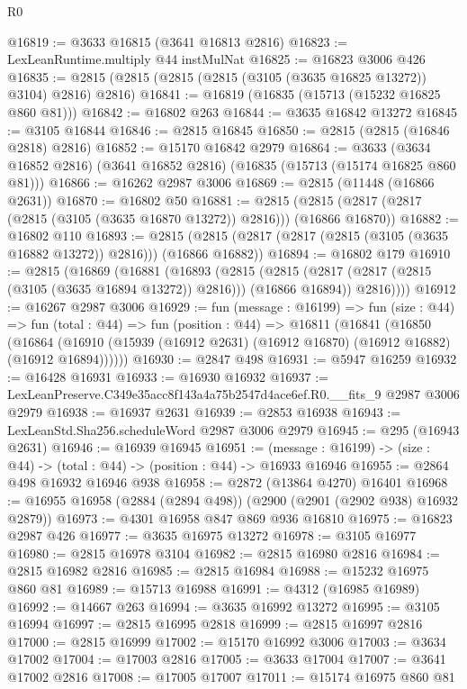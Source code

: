 \begin{lexlean}{R0}
\begin{coremodule}
@16819 := @3633 @16815 (@3641 @16813 @2816)
@16823 := LexLeanRuntime.multiply @44 instMulNat
@16825 := @16823 @3006 @426
@16835 := @2815 (@2815 (@2815 (@2815 (@3105 (@3635 @16825 @13272)) @3104) @2816) @2816)
@16841 := @16819 (@16835 (@15713 (@15232 @16825 @860 @81)))
@16842 := @16802 @263
@16844 := @3635 @16842 @13272
@16845 := @3105 @16844
@16846 := @2815 @16845
@16850 := @2815 (@2815 (@16846 @2818) @2816)
@16852 := @15170 @16842 @2979
@16864 := @3633 (@3634 @16852 @2816) (@3641 @16852 @2816) (@16835 (@15713 (@15174 @16825 @860 @81)))
@16866 := @16262 @2987 @3006
@16869 := @2815 (@11448 (@16866 @2631))
@16870 := @16802 @50
@16881 := @2815 (@2815 (@2817 (@2817 (@2815 (@3105 (@3635 @16870 @13272)) @2816))) (@16866 @16870))
@16882 := @16802 @110
@16893 := @2815 (@2815 (@2817 (@2817 (@2815 (@3105 (@3635 @16882 @13272)) @2816))) (@16866 @16882))
@16894 := @16802 @179
@16910 := @2815
    (@16869
      (@16881
        (@16893
          (@2815
            (@2815 (@2817 (@2817 (@2815 (@3105 (@3635 @16894 @13272)) @2816))) (@16866 @16894))
            @2816))))
@16912 := @16267 @2987 @3006
@16929 := fun (message : @16199) =>
  fun (size : @44) =>
  fun (total : @44) =>
  fun (position : @44) =>
  @16811
    (@16841
      (@16850
        (@16864 (@16910 (@15939 (@16912 @2631) (@16912 @16870) (@16912 @16882) (@16912 @16894))))))
@16930 := @2847 @498
@16931 := @5947 @16259
@16932 := @16428 @16931
@16933 := @16930 @16932
@16937 := LexLeanPreserve.C349e35acc8f143a4a75b2547d4ace6ef.R0.__fits_9 @2987 @3006 @2979
@16938 := @16937 @2631
@16939 := @2853 @16938
@16943 := LexLeanStd.Sha256.scheduleWord @2987 @3006 @2979
@16945 := @295 (@16943 @2631)
@16946 := @16939 @16945
@16951 := (message : @16199) -> (size : @44) -> (total : @44) -> (position : @44) -> @16933 @16946
@16955 := @2864 @498 @16932 @16946 @938
@16958 := @2872 (@13864 @4270) @16401
@16968 := @16955 @16958 (@2884 (@2894 @498)) (@2900 (@2901 (@2902 @938) @16932 @2879))
@16973 := @4301 @16958 @847 @869 @936 @16810
@16975 := @16823 @2987 @426
@16977 := @3635 @16975 @13272
@16978 := @3105 @16977
@16980 := @2815 @16978 @3104
@16982 := @2815 @16980 @2816
@16984 := @2815 @16982 @2816
@16985 := @2815 @16984
@16988 := @15232 @16975 @860 @81
@16989 := @15713 @16988
@16991 := @4312 (@16985 @16989)
@16992 := @14667 @263
@16994 := @3635 @16992 @13272
@16995 := @3105 @16994
@16997 := @2815 @16995 @2818
@16999 := @2815 @16997 @2816
@17000 := @2815 @16999
@17002 := @15170 @16992 @3006
@17003 := @3634 @17002
@17004 := @17003 @2816
@17005 := @3633 @17004
@17007 := @3641 @17002 @2816
@17008 := @17005 @17007
@17011 := @15174 @16975 @860 @81

\end{coremodule}
\end{lexlean}

